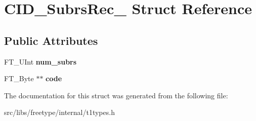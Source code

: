 \hypertarget{struct_c_i_d___subrs_rec__}{
\section{CID\_\-SubrsRec\_\- Struct Reference}
\label{struct_c_i_d___subrs_rec__}
}
\subsection*{Public Attributes}
\begin{DoxyCompactItemize}
\item 
\hypertarget{struct_c_i_d___subrs_rec___a3abd23388e2e0f4888f826a993953c7e}{
FT\_\-UInt {\bfseries num\_\-subrs}}
\label{struct_c_i_d___subrs_rec___a3abd23388e2e0f4888f826a993953c7e}

\item 
\hypertarget{struct_c_i_d___subrs_rec___a1a4f0a4e514492fccaf81d7ede6c4e08}{
FT\_\-Byte $\ast$$\ast$ {\bfseries code}}
\label{struct_c_i_d___subrs_rec___a1a4f0a4e514492fccaf81d7ede6c4e08}

\end{DoxyCompactItemize}


The documentation for this struct was generated from the following file:\begin{DoxyCompactItemize}
\item 
src/libs/freetype/internal/t1types.h\end{DoxyCompactItemize}
